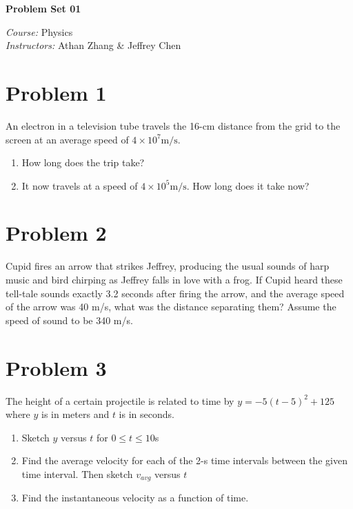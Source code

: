 \documentclass[tikz,border=10pt]{article}
\newcommand{\course}{Physics}
\newcommand{\instructor}{Athan Zhang \& Jeffrey Chen}
\begin{document}
\begin{center}
\textbf{\Huge Problem Set 01} %
\end{center}

\begin{flushleft}
\emph{Course:} \course \\
\emph{Instructors:} \instructor \\
\end{flushleft}

\section*{Problem 1}

An electron in a television tube travels the 16-cm distance from the grid to the screen at an average speed of $4 \times 10^{7} \text{m/s}$.
\begin{enumerate}
    \item How long does the trip take?
    \item It now travels at a speed of $4 \times 10^{5} \text{m/s}$. How long does it take now?
\end{enumerate}

\section*{Problem 2}
Cupid fires an arrow that strikes Jeffrey, producing the usual sounds of harp music and bird chirping as Jeffrey falls in love with a frog. If Cupid heard these tell-tale sounds exactly 3.2 seconds after firing the arrow, and the average speed of the arrow was 40 m/s, what was the distance separating them? Assume the speed of sound to be 340 m/s.

\section*{Problem 3}

The height of a certain projectile is related to time by $y = -5(t -5)^{2} + 125$ where $y$ is in meters and $t$ is in seconds.

\begin{enumerate}
    \item Sketch $y$ versus $t$ for $0 \leq t \leq 10$s
    \item Find the average velocity for each of the 2-s time intervals between the given time interval. Then sketch $v_{avg}$ versus $t$
    \item Find the instantaneous velocity as a function of time.
\end{enumerate}
\end{document}
